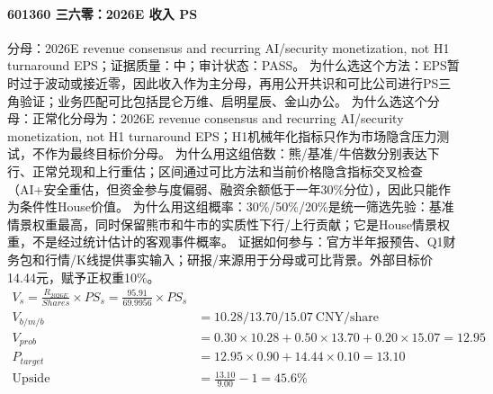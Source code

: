 \paragraph{601360 三六零：2026E 收入 PS}
分母：2026E revenue consensus and recurring AI/security monetization, not H1 turnaround EPS；证据质量：中；审计状态：PASS。
为什么选这个方法：EPS暂时过于波动或接近零，因此收入作为主分母，再用公开共识和可比公司进行PS三角验证；业务匹配可比包括昆仑万维、启明星辰、金山办公。
为什么选这个分母：正常化分母为：2026E revenue consensus and recurring AI/security monetization, not H1 turnaround EPS；H1机械年化指标只作为市场隐含压力测试，不作为最终目标价分母。
为什么用这组倍数：熊/基准/牛倍数分别表达下行、正常兑现和上行重估；区间通过可比方法和当前价格隐含指标交叉检查（AI+安全重估，但资金参与度偏弱、融资余额低于一年30\%分位），因此只能作为条件性House价值。
为什么用这组概率：30\%/50\%/20\%是统一筛选先验：基准情景权重最高，同时保留熊市和牛市的实质性下行/上行贡献；它是House情景权重，不是经过统计估计的客观事件概率。
证据如何参与：官方半年报预告、Q1财务包和行情/K线提供事实输入；研报/来源用于分母或可比背景。外部目标价14.44元，赋予正权重10\%。
\begin{align*}
V_s = \frac{R_{2026E}}{Shares}\times PS_s=\frac{95.91}{69.9956}\times PS_s\\
V_{b/m/b} &= 10.28/13.70/15.07\ \mathrm{CNY/share}\\
V_{prob} &= 0.30\times 10.28+0.50\times 13.70+0.20\times 15.07=12.95\\
P_{target} &= 12.95\times 0.90+14.44\times 0.10=13.10\\
\mathrm{Upside} &= \frac{13.10}{9.00}-1=45.6\%\\
\end{align*}


